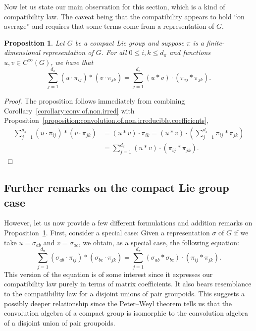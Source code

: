\documentclass[pdftex]{sigma}
\numberwithin{equation}{section}
\newtheorem{Proposition}[Theorem]{Proposition}
\theoremstyle{definition}
\begin{document}
Now let us state our main observation for this section, which is a kind of compatibility law. The caveat being that the compatibility appears to hold ``on average'' and requires that some terms come from a representation of $ G $.
\begin{Proposition}\label{proposition:new.weak.compatibility}
Let $ G $ be a compact Lie group and suppose $ \pi $ is a finite-dimensional representation of $ G $. For all
  $0 \le i,k \le d_\pi $
  and functions $ u, v \in C^\infty(G) $, we have that
\begin{equation*}\label{eqn:thm.weakly.hopeful}
  \sum_{j=1}^{d_\pi} (u \cdot \pi_{ij}) * ( v \cdot \pi_{jk} ) = \sum_{j=1}^{d_\pi} (u * v) \cdot (\pi_{ij} * \pi_{jk} ).
  \end{equation*}
\end{Proposition}
\begin{proof}
The proposition follows immediately from combining Corollary~\ref{corollary:conv.of.non.irred} with Proposition~\ref{proposition:convolution.of.non.irreducible.coefficients},
 \begin{align*}
 \sum_{j=1}^{d_\pi} ( u \cdot \pi_{ij}) * ( v \cdot \pi_{jk}) &= (u * v) \cdot \pi_{ik} = (u * v) \cdot \left( \sum_{j=1}^{d_\pi} \pi_{ij} * \pi_{jk} \right) \\
 &= \sum_{j=1}^{d_\pi} (u * v) \cdot ( \pi_{ij} * \pi_{jk} ). \tag*{\qed}
 \end{align*}\renewcommand{\qed}{}
\end{proof}

\subsection{Further remarks on the compact Lie group case}\label{subsection:further.remarks}
However, let us now provide a few different formulations and addition remarks on Proposition~\ref{proposition:new.weak.compatibility}. First, consider a special case: Given a representation $ \sigma $ of $ G $ if we take $ u = \sigma_{ab} $ and $ v = \sigma_{ac} $, we obtain, as a special case, the following equation:
\begin{equation}\label{eqn:new.compatibility.in.basis}
  \sum_{j=1}^{d_\pi} ( \sigma_{ab} \cdot \pi_{ij} ) * (\sigma_{bc} \cdot \pi_{jk} ) = \sum_{j=1}^{d_\pi} (\sigma_{ab} * \sigma_{bc} ) \cdot (\pi_{ij} * \pi_{jk}).
\end{equation}
This version of the equation is of some interest since it expresses our compatibility law purely in terms of matrix coefficients. It also bears resemblance to the compatibility law for a disjoint unions of pair groupoids.
This suggests a possibly deeper relationship since the Peter--Weyl theorem tells us that the convolution algebra of a compact group is isomorphic to the convolution algebra of a disjoint union of pair groupoids.
\end{document}
